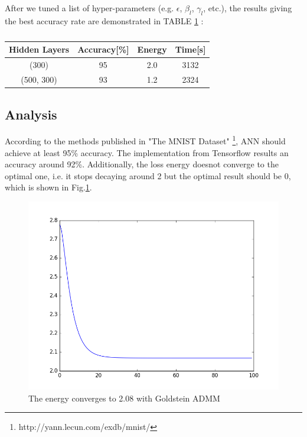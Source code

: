 \documentclass[letterpaper, 10 pt, conference]{ieeeconf}  %
\begin{document}
After we tuned a list of hyper-parameters (e.g. $\epsilon$, $\beta_l$, $\gamma_l$, etc.), the results giving the best accuracy rate are demonstrated in TABLE \ref{tab:res1}
:
\begin{table}[h]
\centering
\caption{}
\begin{tabular}{|c|c|c|c|}
\hline
		Hidden Layers & Accuracy[\%] & Energy &Time[s]\\
\hline
		(300) & 95 & 2.0 & 3132\\
		(500, 300) & 93 & 1.2 & 2324 \\
\hline
\end{tabular}
\label{tab:res1}
\end{table}

\subsection{Analysis}
According to the methods published in "The MNIST Dataset" \footnote{http://yann.lecun.com/exdb/mnist/}, ANN should achieve at least 95\% accuracy. The implementation from Tensorflow results an accuracy around 92\%. Additionally, the loss energy doesnot converge to the optimal one, i.e. it stops decaying around 2 but the optimal result should be 0, which is shown in Fig.\ref{fig:energySame}.

\begin{figure}
\centering
\includegraphics[width=\columnwidth]{figure/energy_has_lambda.png}
\caption{The energy converges to 2.08 with Goldstein ADMM}
\label{fig:energySame}
\end{figure}
\end{document}
